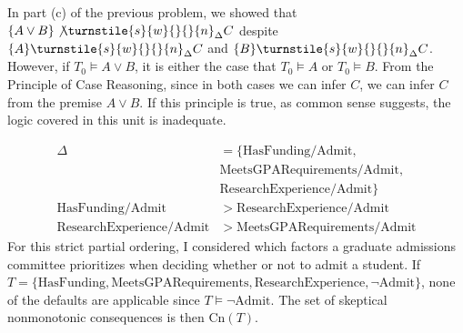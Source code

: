 \documentclass{article}
\begin{document}
\clearpage

\problem
In part (c) of the previous problem, we showed that $\{A \lor B\} \not\turnstile{s}{w}{}{}{n}_\Delta C$ despite $\{A\} \turnstile{s}{w}{}{}{n}_\Delta C$ and $\{B\} \turnstile{s}{w}{}{}{n}_\Delta C$. However, if $T_0 \vDash A \lor B$, it is either the case that $T_0 \vDash A$ or $T_0 \vDash B$. From the Principle of Case Reasoning, since in both cases we can infer $C$, we can infer $C$ from the premise $A \lor B$. If this principle is true, as common sense suggests, the logic covered in this unit is inadequate.

\clearpage

\problem
\begin{align*}
    \Delta & = \{\textrm{HasFunding}/\textrm{Admit}, \\
    & \textrm{MeetsGPARequirements}/\textrm{Admit}, \\
    & \textrm{ResearchExperience}/\textrm{Admit}\} \\
    \textrm{HasFunding}/\textrm{Admit} & > \textrm{ResearchExperience}/\textrm{Admit} \\
    \textrm{ResearchExperience}/\textrm{Admit} & > \textrm{MeetsGPARequirements}/\textrm{Admit}
\end{align*}
For this strict partial ordering, I considered which factors a graduate admissions committee prioritizes when deciding whether or not to admit a student. If $T = \{\textrm{HasFunding}, \textrm{MeetsGPARequirements}, \textrm{ResearchExperience}, \lnot \textrm{Admit}\}$, none of the defaults are applicable since $T \vDash \lnot\textrm{Admit}$. The set of skeptical nonmonotonic consequences is then $\textrm{Cn}(T)$.
\end{document}
